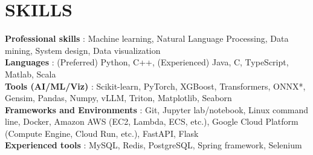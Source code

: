 \section{SKILLS}
 \begin{itemize}[leftmargin=0in, label={}]
    \small{\item{
     \textbf{Professional skills} {: Machine learning, Natural Language Processing, Data mining, System design, Data visualization}\vspace{2pt} \\
     \textbf{Languages} {: (Preferred) Python, C++, (Experienced) Java, C, TypeScript, Matlab, Scala} \vspace{2pt} \\
     \textbf{Tools (AI/ML/Viz)}     {: Scikit-learn, PyTorch, XGBoost, Transformers, ONNX*, Gensim, Pandas, Numpy, vLLM, Triton, Matplotlib, Seaborn}\vspace{2pt} \\
     \textbf{Frameworks and Environments}     {: Git, Jupyter lab/notebook, Linux command line, Docker, Amazon AWS (EC2, Lambda, ECS, etc.), Google Cloud Platform (Compute Engine, Cloud Run, etc.), FastAPI, Flask}\vspace{2pt} \\
     \textbf{Experienced tools} {: MySQL, Redis, PostgreSQL, Spring framework, Selenium}
    }}
 \end{itemize}
